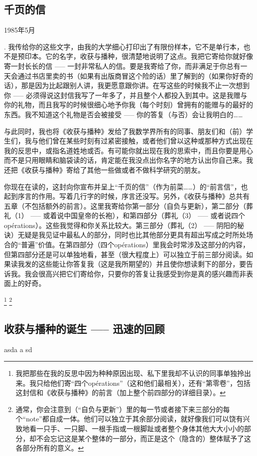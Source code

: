 \documentclass[12pt]{article}
\begin{document}
\subsection{千页的信}

\hfill 1985年5月

. 我传给你的这些文字，由我的大学细心打印出了有限份样本，它不是单行本，也不是预印本。它的名字，收获与播种，很清楚地说明了这点。我把它寄给你就好像寄一封长长的信 ----- 一封非常私人的信。要是我寄给了你，而非满足于你总有一天会通过书店里卖的书（如果有出版商冒这个险的话）里了解到的（如果你好奇的话），那是因为比起跟别人讲，我更愿意跟你讲。在写这些的时候我不止一次想到你 ----- 必须得说这封信我写了一年多了，并且整个人都投入到其中。这是我赠与你的礼物，而且我写的时候很细心地予你我（每个时刻）曾拥有的能赠与的最好的东西。我不知道这个礼物是否会被接受 ----- 你的答复（与否）会让我明白的……

与此同时，我也将《收获与播种》发给了我数学界所有的同事、朋友们和（前）学生们，我与他们曾在某些时刻有过紧密接触，或者他们曾以这种或那种方式出现在我的反思\footnotemark 中，或指名道姓地或否。有可能你就出现在我的思索中，而且你要是用心而不是只用眼睛和脑袋读的话，肯定能在我没点出你名字的地方认出你自己来。我还把《收获与播种》寄给了其他一些做或者不做科学研究的朋友。

你现在在读的，这封向你宣布并呈上“千页的信”（作为前菜……）的“前言信”，也起到序言的作用。写着几行字的时候，序言还没写。另外，《收获与播种》总共有五章（不包括额外的前言）。这里我寄给你第一部分（自负与更新），第二部分（葬礼（1） ----- 或着说中国皇帝的长袍），和第四部分（葬礼（3） ----- 或者说四个opérations）\footnotemark。这些我觉得和你关系比较大。第三部分（葬礼（2） ----- 阴阳的秘诀）无疑是我见证中最私人的部分，同时也比其他部分更具有超出写成之时所处场合的“普遍”价值。在第四部分（四个opérations）里我会时常涉及这部分的内容，但第四部分还是可以单独地看，甚至（很大程度上）可以独立于前三部分阅读\footnotemark。如果读我发的这些能让你答复我（这是我所期望的）并且使你想读剩下的部分，要告诉我。我会很高兴把它们寄给你，只要你的答复让我感受到你是真的感兴趣而非表面上的好奇。

\footnote{我把那些在我的反思中因为种种原因出现、私下里我却不认识的同事单独拎出来。我只给他们寄“四个opérations”（这和他们最相关），还有“第零卷”，包括这封信和《收获与播种》的前言（加上整个前四部分的详细目录）。}
\footnote{通常，你会注意到（“自负与更新”）里的每一节或者接下来三部分的每个“note”都自成一体。他们可以独立于其余部分阅读，就好像我们可以饶有兴致地看一只手、一只脚、一根手指或一根脚趾或者整个身体其他大大小小的部分，却不会忘记这是某个整体的一部分，而正是这个（隐含的）整体赋予了这各部分所有的意义。}




\subsection{收获与播种的诞生 ----- 迅速的回顾}

asda \footnotemark a sd
\end{document}
